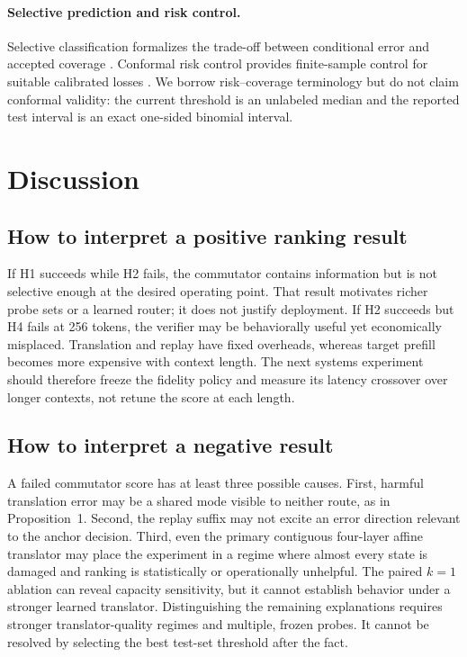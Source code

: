 \documentclass[10pt,twocolumn]{article}
\begin{document}
\paragraph{Selective prediction and risk control.}
Selective classification formalizes the trade-off between conditional error
and accepted coverage \citep{geifman2019selectivenet}.  Conformal risk control
provides finite-sample control for suitable calibrated losses
\citep{angelopoulos2024conformal}.  We borrow risk--coverage terminology but do
not claim conformal validity: the current threshold is an unlabeled median and
the reported test interval is an exact one-sided binomial interval.

\section{Discussion}

\subsection{How to interpret a positive ranking result}

If H1 succeeds while H2 fails, the commutator contains information but is not
selective enough at the desired operating point.  That result motivates richer
probe sets or a learned router; it does not justify deployment.  If H2 succeeds
but H4 fails at 256 tokens, the verifier may be behaviorally useful yet
economically misplaced.  Translation and replay have fixed overheads, whereas
target prefill becomes more expensive with context length.  The next systems
experiment should therefore freeze the fidelity policy and measure its
latency crossover over longer contexts, not retune the score at each length.

\subsection{How to interpret a negative result}

A failed commutator score has at least three possible causes.  First, harmful
translation error may be a shared mode visible to neither route, as in
Proposition~1.  Second, the replay suffix may not excite an error direction
relevant to the anchor decision.  Third, even the primary contiguous
four-layer affine translator may place the experiment in a regime where almost
every state is damaged and ranking is statistically or operationally
unhelpful.  The paired $k=1$ ablation can reveal capacity sensitivity, but it
cannot establish behavior under a stronger learned translator.  Distinguishing
the remaining explanations requires stronger translator-quality regimes and
multiple, frozen probes.  It cannot be resolved by selecting the best
test-set threshold after the fact.
\end{document}
